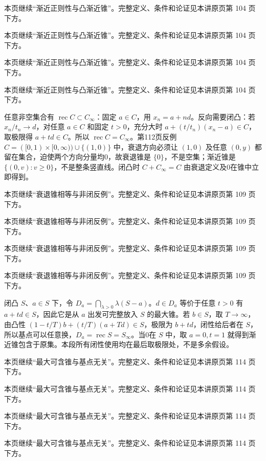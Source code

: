 本页继续“渐近正则性与凸渐近锥”。完整定义、条件和论证见本讲原页第 104 页下方。

本页继续“渐近正则性与凸渐近锥”。完整定义、条件和论证见本讲原页第 104 页下方。

本页继续“渐近正则性与凸渐近锥”。完整定义、条件和论证见本讲原页第 104 页下方。

本页继续“渐近正则性与凸渐近锥”。完整定义、条件和论证见本讲原页第 104 页下方。

任意非空集合有 $\operatorname{rec}C\subset C_\infty$：固定 $a\in C$，用 $x_n=a+nd$。反向需要闭凸：若 $x_n/t_n\to d$，对任意 $a\in C$ 和固定 $t>0$，充分大时 $a+(t/t_n)(x_n-a)\in C$，取极限得 $a+td\in C$。所以 $\operatorname{rec}C=C_\infty$。第112页反例 $C=([0,1)\times[0,\infty))\cup\{(1,0)\}$ 中，衰退方向必须让 $(1,0)$ 及任意 $(0,y)$ 都留在集合，迫使两个方向分量均0，故衰退锥是 $\{0\}$，不是空集；渐近锥是 $\{(0,v):v\ge0\}$，不是整条竖直线。闭凸时 $C+C_\infty=C$ 由衰退定义及0在锥中立即得到。

本页继续“衰退锥相等与非闭反例”。完整定义、条件和论证见本讲原页第 109 页下方。

本页继续“衰退锥相等与非闭反例”。完整定义、条件和论证见本讲原页第 109 页下方。

本页继续“衰退锥相等与非闭反例”。完整定义、条件和论证见本讲原页第 109 页下方。

本页继续“衰退锥相等与非闭反例”。完整定义、条件和论证见本讲原页第 109 页下方。

闭凸 $S$、$a\in S$ 下，令 $D_a=\bigcap_{\lambda>0}\lambda(S-a)$。$d\in D_a$ 等价于任意 $t>0$ 有 $a+td\in S$，因此它是从 $a$ 出发可完整放入 $S$ 的最大锥。若 $b\in S$，取 $T\to\infty$，由凸性 $(1-t/T)b+(t/T)(a+Td)\in S$，极限为 $b+td$，闭性给后者在 $S$，所以基点可以任意换，$D_a=\operatorname{rec}S=S_\infty$。当0在 $S$ 中，取 $a=0,t=1$ 就得到渐近锥包含于原集。本段所有闭性使用均在最后取极限处，不是多余假设。

本页继续“最大可含锥与基点无关”。完整定义、条件和论证见本讲原页第 114 页下方。

本页继续“最大可含锥与基点无关”。完整定义、条件和论证见本讲原页第 114 页下方。

本页继续“最大可含锥与基点无关”。完整定义、条件和论证见本讲原页第 114 页下方。

本页继续“最大可含锥与基点无关”。完整定义、条件和论证见本讲原页第 114 页下方。
